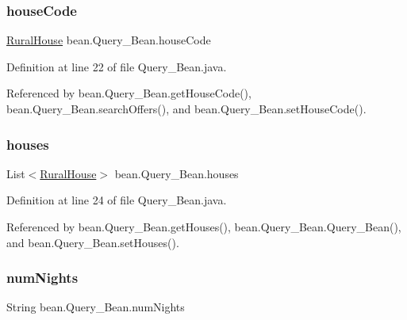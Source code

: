 \subsubsection{\texorpdfstring{houseCode}{houseCode}}
{\footnotesize\ttfamily \mbox{\hyperlink{classdomain_1_1RuralHouse}{Rural\+House}} bean.\+Query\+\_\+\+Bean.\+house\+Code\hspace{0.3cm}{\ttfamily [package]}}



Definition at line 22 of file Query\+\_\+\+Bean.\+java.



Referenced by bean.\+Query\+\_\+\+Bean.\+get\+House\+Code(), bean.\+Query\+\_\+\+Bean.\+search\+Offers(), and bean.\+Query\+\_\+\+Bean.\+set\+House\+Code().

\mbox{\label{classbean_1_1Query__Bean_a8c158c927390375bed7935b2db5e4f53}} 
\subsubsection{\texorpdfstring{houses}{houses}}
{\footnotesize\ttfamily List$<$\mbox{\hyperlink{classdomain_1_1RuralHouse}{Rural\+House}}$>$ bean.\+Query\+\_\+\+Bean.\+houses\hspace{0.3cm}{\ttfamily [package]}}



Definition at line 24 of file Query\+\_\+\+Bean.\+java.



Referenced by bean.\+Query\+\_\+\+Bean.\+get\+Houses(), bean.\+Query\+\_\+\+Bean.\+Query\+\_\+\+Bean(), and bean.\+Query\+\_\+\+Bean.\+set\+Houses().

\mbox{\label{classbean_1_1Query__Bean_a76fd38e1297497efc591fc46a6ae64f4}} 
\subsubsection{\texorpdfstring{numNights}{numNights}}
{\footnotesize\ttfamily String bean.\+Query\+\_\+\+Bean.\+num\+Nights\hspace{0.3cm}{\ttfamily [package]}}



